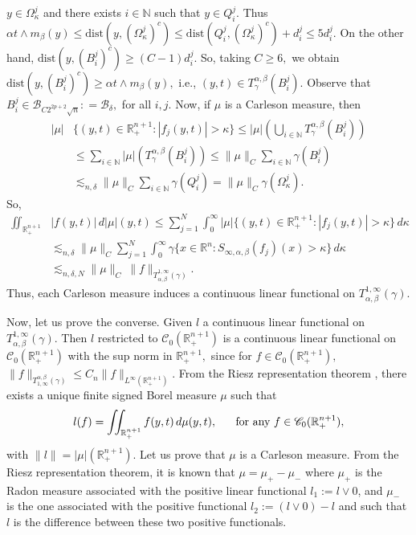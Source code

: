 \documentclass[leqno,11pt]{amsart}
\theoremstyle{plain}
\theoremstyle{remark}
\begin{document}
{{{{$y\in \Omega_\kappa^j$ and there exists $i\in {\mathbb N}$ such that $y\in Q_i^j.$ Thus $\alpha t\wedge m_\beta(y)\le \text{dist}(y,(\Omega_\kappa^j)^c)\le \text{dist}(Q_i^j, (\Omega_\kappa^j)^c)+d_i^j\le 5 d_i^j.$ On the other hand,  $\text{dist}(y, (B_i^j)^c)\ge (C-1)d_i^j.$ So, taking $C\ge 6,$ we obtain $\text{dist}(y, (B_i^j)^c)\ge \alpha t\wedge m_\beta (y),$ i.e., $(y,t)\in T_\gamma^{\alpha, \beta}(B_i^j).$ Observe that $B_i^j\in \mathscr{B}_{C 2^{2p+2}\sqrt{n}}: =\mathscr{B}_{\delta},$ for all $i,j.$  
Now, if $\mu$ is a Carleson measure, then 
\begin{align*}|\mu|&\{(y,t)\in \mathbb{R}^{n+1}_+: |f_j(y,t)|> \kappa\} \le |\mu|\left(\bigcup_{i \in {\mathbb N}}T_\gamma^{\alpha, \beta}(B_i^j)\right)\\ & \le \sum_{i\in {\mathbb N}}|\mu|(T_\gamma^{\alpha,\beta}(B_i^j)) \le \|\mu\|_C \sum_{i\in {\mathbb N}}\gamma(B_i^j)\\ &\lesssim_{n,\delta} \|\mu\|_C
\sum_{i\in {\mathbb N}}\gamma(Q_i^j) = \|\mu\|_C  \gamma(\Omega_\kappa^j). 
\end{align*}
So, 
\begin{align*}\iint_{\mathbb{R}^{n+1}_+}&|f(y,t)|\, d|\mu|(y,t)\le \sum_{j=1}^N\int_0^\infty |\mu|\{(y,t)\in \mathbb{R}^{n+1}_+: |f_j(y,t)|>\kappa\}\, d\kappa\\ &\lesssim_{n, \delta} \|\mu\|_C \sum_{j=1}^N \int_0^\infty 
\gamma\{x\in \mathbb{R}^n: S_{\infty,\alpha,\beta}(f_j)(x)>\kappa\}\, d\kappa\\ &\lesssim_{n,\delta, N} \|\mu\|_C\ \|f\|_{T_{\alpha,\beta}^{1,\infty}(\gamma)}.
\end{align*}}}
Thus, each Carleson measure induces a continuous linear functional on $T^{1,\infty}_{\alpha, \beta}(\gamma).$

 

Now, let us prove the converse. Given $l$ a continuous linear functional on $T^{1,\infty}_{\alpha, \beta}(\gamma)$. Then $l$ restricted to $\mathscr{C}_0(\mathbb{R}^{n+1}_+)$ is a continuous linear functional on $\mathscr{C}_0(\mathbb{R}^{n+1}_+)$ with the sup norm in $\mathbb{R}^{n+1}_+,$ since for $f\in \mathscr{C}_0(\mathbb{R}^{n+1}_+),$ $\|f\|_{T^{\alpha, \beta}_{1,\infty}(\gamma)}\le C_n \|f\|_{L^\infty(\mathbb{R}^{n+1}_+)}.$
From the Riesz representation theorem \cite[Theorem 6.19]{ru}, \cite{ar} there exists a unique finite signed Borel measure $\mu$ such that
\begin{equation}\label{representacionRiesz}
l(f)=\iint_{\mathbb{R}^{n+1}_+} f(y,t)\, d\mu(y,t), \ \ \ \ \hbox{ for any } f\in \mathscr{C}_0(\mathbb{R}^{n+1}_+),
\end{equation}
with $\|l\|=|\mu|(\mathbb{R}^{n+1}_+).$ 
Let us prove that $\mu$ is a Carleson measure. From the Riesz representation theorem, it is known that $\mu=\mu_+-\mu_-$ where $\mu_+$ is the Radon measure associated with the positive linear functional $l_1:=l\vee 0$, and $\mu_-$ is the one associated with the positive functional $l_2:=(l\vee 0)-l$ and such that $l$ is the difference between these two positive functionals.

}}
\end{document}
